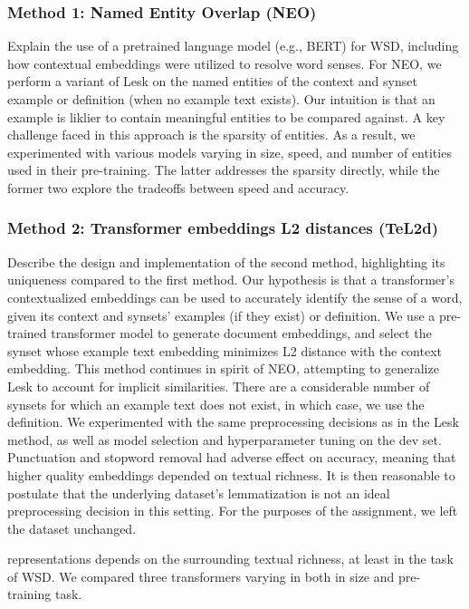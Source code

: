 \documentclass[11pt]{article}
\begin{document}
\subsubsection{Method 1: Named Entity Overlap (NEO)}
Explain the use of a pretrained language model (e.g., BERT) for WSD, including how contextual embeddings were utilized to resolve word senses.
For NEO, we perform a variant of Lesk on the named entities of the context and synset example or definition (when no example text exists).
Our intuition is that an example is liklier to contain meaningful entities to be compared against. A 
key challenge faced in this approach is the sparsity of entities. As a result, we experimented with various models
varying in size, speed, and number of entities used in their pre-training. The latter addresses the sparsity directly,
while the former two explore the tradeoffs between speed and accuracy.

\subsubsection{Method 2: Transformer embeddings L2 distances (TeL2d)}
Describe the design and implementation of the second method, highlighting its uniqueness 
compared to the first method. Our hypothesis is that a transformer's contextualized embeddings 
can be used to accurately identify the sense of a word, given its context and synsets'
examples (if they exist) or definition. We use a pre-trained transformer
model to generate document embeddings, and select the synset whose example text 
embedding minimizes L2 distance with the context embedding. 
This method continues in spirit of NEO, attempting to generalize Lesk to account for implicit similarities. 
There are a considerable number of synsets for which an example text does not exist, 
in which case, we use the definition. We experimented with the same preprocessing decisions 
as in the Lesk method, as well as model selection and hyperparameter tuning on the dev set.
Punctuation and stopword removal had adverse effect on accuracy, meaning that 
higher quality embeddings depended on textual richness. It is then reasonable 
to postulate that the underlying dataset's lemmatization is not an ideal preprocessing decision
in this setting. For the purposes of the assignment, we left the dataset unchanged.

representations depends on the surrounding textual richness, at least in the task of WSD. 
We compared three transformers varying in both in size and pre-training task.
\end{document}
